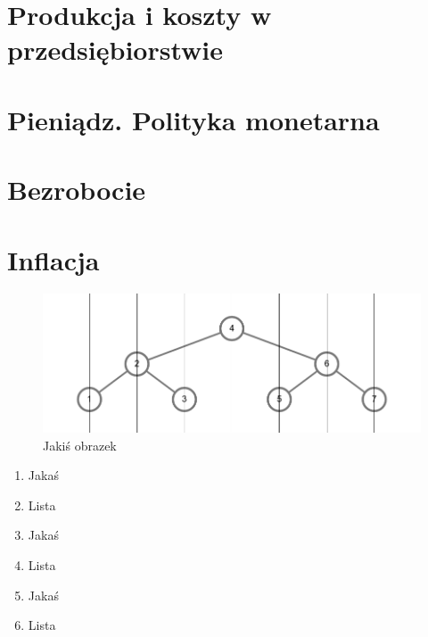 \documentclass[12pt]{extarticle}
\begin{document}
\section{Produkcja i koszty w przedsiębiorstwie}


\section{Pieniądz. Polityka monetarna}
\section{Bezrobocie}
\section{Inflacja}


\begin{figure}[H]
\centering
\includegraphics[width=15cm]{sample}
\caption{Jakiś obrazek}
\end{figure}


\begin{enumerate}
	\item Jakaś
	\item Lista
	\item Jakaś
	\item Lista
	\item Jakaś
	\item Lista
\end{enumerate}

\clearpage\mbox{}\clearpage
\end{document}
